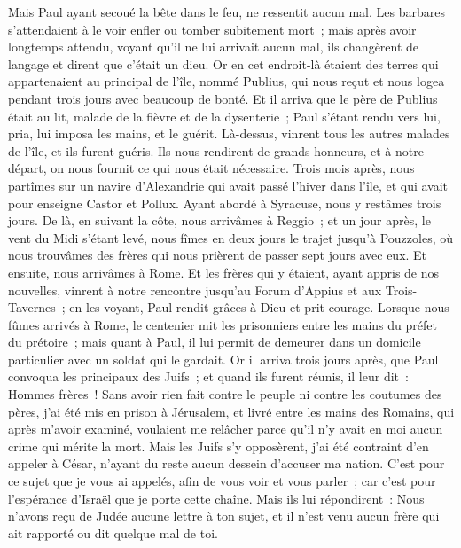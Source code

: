 \begin{multicols}{2}
Mais Paul ayant secoué la bête dans le feu, ne ressentit aucun mal.
Les barbares s'attendaient à le voir enfler ou tomber subitement mort~; mais après avoir longtemps attendu, voyant qu'il ne lui arrivait aucun mal, ils changèrent de langage et dirent que c'était un dieu.
Or en cet endroit-là étaient des terres qui appartenaient au principal de l'île, nommé Publius, qui nous reçut et nous logea pendant trois jours avec beaucoup de bonté.
Et il arriva que le père de Publius était au lit, malade de la fièvre et de la dysenterie~; Paul s'étant rendu vers lui, pria, lui imposa les mains, et le guérit.
Là-dessus, vinrent tous les autres malades de l'île, et ils furent guéris.
Ils nous rendirent de grands honneurs, et à notre départ, on nous fournit ce qui nous était nécessaire.
Trois mois après, nous partîmes sur un navire d'Alexandrie qui avait passé l'hiver dans l'île, et qui avait pour enseigne Castor et Pollux.
Ayant abordé à Syracuse, nous y restâmes trois jours.
De là, en suivant la côte, nous arrivâmes à Reggio~; et un jour après, le vent du Midi s'étant levé, nous fîmes en deux jours le trajet jusqu'à Pouzzoles,
où nous trouvâmes des frères qui nous prièrent de passer sept jours avec eux. Et ensuite, nous arrivâmes à Rome.
Et les frères qui y étaient, ayant appris de nos nouvelles, vinrent à notre rencontre jusqu'au Forum d'Appius et aux Trois-Tavernes~; en les voyant, Paul rendit grâces à Dieu et prit courage.
Lorsque nous fûmes arrivés à Rome, le centenier mit les prisonniers entre les mains du préfet du prétoire~; mais quant à Paul, il lui permit de demeurer dans un domicile particulier avec un soldat qui le gardait.
Or il arriva trois jours après, que Paul convoqua les principaux des Juifs~; et quand ils furent réunis, il leur dit~: Hommes frères~! Sans avoir rien fait contre le peuple ni contre les coutumes des pères, j'ai été mis en prison à Jérusalem, et livré entre les mains des Romains,
qui après m'avoir examiné, voulaient me relâcher parce qu'il n'y avait en moi aucun crime qui mérite la mort.
Mais les Juifs s'y opposèrent, j'ai été contraint d'en appeler à César, n'ayant du reste aucun dessein d'accuser ma nation.
C'est pour ce sujet que je vous ai appelés, afin de vous voir et vous parler~; car c'est pour l'espérance d'Israël que je porte cette chaîne.
Mais ils lui répondirent~: Nous n'avons reçu de Judée aucune lettre à ton sujet, et il n'est venu aucun frère qui ait rapporté ou dit quelque mal de toi.

\end{multicols}
